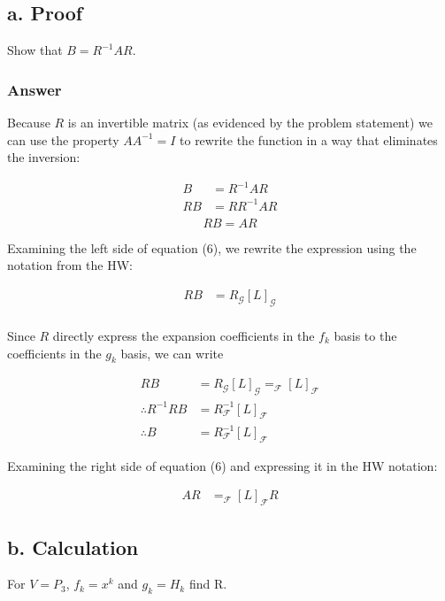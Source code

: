 \documentclass{article}
\begin{document}
		\subsection{a. Proof}
		Show that $B=R^{-1}AR$.
		
		\subsubsection{Answer}
		
		Because $R$ is an invertible matrix (as evidenced by the problem statement) we can use the property $AA^{-1}=I$ to rewrite the function in a way that eliminates the inversion:
		
		\begin{align*}
			B&=R^{-1}AR\\
			RB&=RR^{-1}AR\\
		\end{align*}
		\begin{equation}
		RB=AR
		\end{equation}
		
		Examining the left side of equation (6), we rewrite the expression using the notation from the HW:
		
		\begin{align*}
			RB&=R_{\mathcal{G}}[L]_{\mathcal{G}}\\
		\end{align*}
		
		Since $R$ directly express the expansion coefficients in the $f_{k}$ basis to the coefficients in the $g_k$ basis, we can write
		
		\begin{align*}
			RB&=R_{\mathcal{G}}[L]_{\mathcal{G}}=_{\mathcal{F}}[L]_{\mathcal{F}} \\
			\therefore R^{-1}RB&=R^{-1} _{\mathcal{F}}[L]_{\mathcal{F}}\\
			\therefore B&=R^{-1} _{\mathcal{F}}[L]_{\mathcal{F}}
		\end{align*}
		
		Examining the right side of equation (6) and expressing it in the HW notation:
		
		\begin{align*}
			AR&=_{\mathcal{F}}[L]_{\mathcal{F}}R
		\end{align*}
		

		\subsection{b. Calculation}
		For $V=P_{3}$, $f_{k}=x^{k}$ and $g_{k}=H_{k}$ find R.
		
\end{document}
